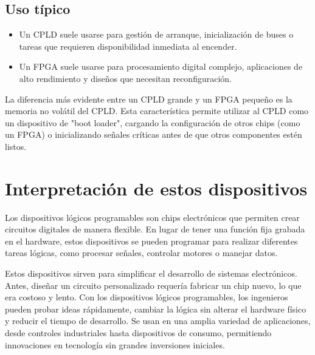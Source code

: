 \documentclass{article}
\theoremstyle{mytheoremstyle}
\theoremstyle{mytheoremstyle}
\theoremstyle{myproblemstyle}
\begin{document}
\subsection*{Uso típico}
\begin{itemize}
    \item Un CPLD suele usarse para gestión de arranque, inicialización de buses o tareas que requieren disponibilidad inmediata al encender.
    \item Un FPGA suele usarse para procesamiento digital complejo, aplicaciones de alto rendimiento y diseños que necesitan reconfiguración.
\end{itemize}

La diferencia más evidente entre un CPLD grande y un FPGA pequeño es la memoria no volátil del CPLD.  
Esta característica permite utilizar al CPLD como un dispositivo de "boot loader", cargando la
configuración de otros chips (como un FPGA) o inicializando señales críticas antes de que otros
componentes estén listos.

\section{Interpretación de estos dispositivos}
Los dispositivos lógicos programables son chips electrónicos que permiten crear circuitos
digitales de manera flexible. En lugar de tener una función fija grabada en el hardware, estos
dispositivos se pueden programar para realizar diferentes tareas lógicas, como procesar señales,
controlar motores o manejar datos.

Estos dispositivos sirven para simplificar el desarrollo de sistemas electrónicos. Antes, diseñar
un circuito personalizado requería fabricar un chip nuevo, lo que era costoso y lento. Con los
dispositivos lógicos programables, los ingenieros pueden probar ideas rápidamente, cambiar la
lógica sin alterar el hardware físico y reducir el tiempo de desarrollo. Se usan en una amplia
variedad de aplicaciones, desde controles industriales hasta dispositivos de consumo, permitiendo
innovaciones en tecnología sin grandes inversiones iniciales.
\end{document}
